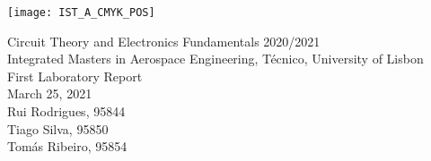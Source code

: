 
\thispagestyle {empty}

\texttt{[image: IST\_A\_CMYK\_POS]}

\begin{center}
%
\vspace{1.0cm}

\vspace{1cm}
{\FontLb Circuit Theory and Electronics Fundamentals 2020/2021} \\ %
\vspace{1cm}
{\FontSn Integrated Masters in Aerospace Engineering, Técnico, University of Lisbon} \\ %
\vspace{1cm}
{\FontSn First Laboratory Report} \\
\vspace{1cm}
{\FontSn March 25, 2021} \\ %
%
\vspace{1cm}
{\FontSn Rui Rodrigues, 95844 \\ Tiago Silva, 95850\\ Tomás Ribeiro, 95854}

\end{center}

